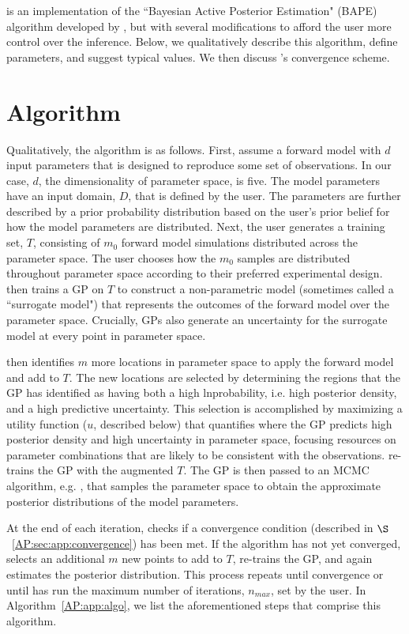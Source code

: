 \approxposterior is an implementation of the ``Bayesian Active Posterior Estimation" (BAPE) algorithm developed by \citet{Kandasamy2017}, but with several modifications to afford the user more control over the inference. Below, we qualitatively describe this algorithm, define parameters, and suggest typical values. We then discuss \approxposterior's convergence scheme.

\section{\approxposterior Algorithm} \label{AP:sec:app}

Qualitatively, the \approxposterior algorithm is as follows. First, assume a forward model with $d$ input parameters that is designed to reproduce some set of observations. In our case, $d$, the dimensionality of parameter space, is five. The model parameters have an input domain, $D$, that is defined by the user. The parameters are further described by a prior probability distribution based on the user's prior belief for how the model parameters are distributed.  Next, the user generates a training set, $T$, consisting of $m_0$ forward model simulations distributed across the parameter space. The user chooses how the $m_0$ samples are distributed throughout parameter space according to their preferred experimental design. \approxposterior then trains a GP on $T$ to construct a non-parametric model (sometimes called a ``surrogate model") that represents the outcomes of the forward model over the parameter space. Crucially, GPs also generate an uncertainty for the surrogate model at every point in parameter space.

\approxposterior then identifies $m$ more locations in parameter space to apply the forward model and add to $T$. The new locations are selected by determining the regions that the GP has identified as having both a high lnprobability, i.e. high posterior density, and a high predictive uncertainty. This selection is accomplished by maximizing a utility function ($u$, described below) that quantifies where the GP predicts high posterior density and high uncertainty in parameter space, focusing resources on parameter combinations that are likely to be consistent with the observations. \approxposterior re-trains the GP with the augmented $T$. The GP is then passed to an MCMC algorithm, e.g. \emcee, that samples the parameter space to obtain the approximate posterior distributions of the model parameters.

At the end of each iteration, \approxposterior checks if a convergence condition (described in $\S$~\ref{AP:sec:app:convergence}) has been met. If the algorithm  has not yet converged, \approxposterior selects an additional $m$ new points to add to $T$, re-trains the GP, and again estimates the posterior distribution. This process repeats until convergence or until \approxposterior has run the maximum number of iterations, $n_{max}$, set by the user. In Algorithm~\ref{AP:app:algo}, we list the aforementioned steps that comprise this algorithm.

